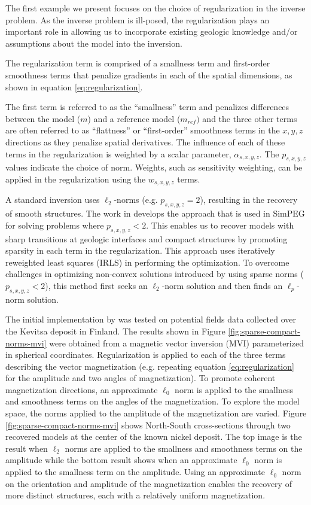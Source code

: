 The first example we present focuses on the choice of regularization in the inverse problem. As the inverse problem is ill-posed, the regularization plays an important role in allowing us to incorporate existing geologic knowledge and/or assumptions about the model into the inversion.

The regularization term is comprised of a smallness term and first-order smoothness terms that penalize gradients in each of the spatial dimensions, as shown in equation \ref{eq:regularization}.

The first term is referred to as the ``smallness'' term and penalizes differences between the model ($m$) and a reference model ($m_{ref})$ and the three other terms are often referred to as ``flattness'' or ``first-order'' smoothness terms in the $x, y, z$ directions as they penalize spatial derivatives. The influence of each of these terms in the regularization is weighted by a scalar parameter, $\alpha_{s, x, y, z}$. The $p_{s, x, y, z}$ values indicate the choice of norm. Weights, such as sensitivity weighting, can be applied in the regularization using the $w_{s,x,y,z}$ terms.

A standard inversion uses $\ell_2$-norms (e.g. $p_{s, x, y, z} =2$), resulting in the recovery of smooth structures. The work in \cite{fournier_inversion_2019} develops the approach that is used in SimPEG for solving problems where $p_{s, x, y, z} < 2$. This enables us to recover models with sharp transitions at geologic interfaces and compact structures by promoting sparsity in each term in the regularization. This approach uses iteratively reweighted least squares (IRLS) in performing the optimization. To overcome challenges in optimizing non-convex solutions introduced by using sparse norms ($p_{s, x, y, z} < 2$), this method first seeks an $\ell_2$-norm solution and then finds an $\ell_p$-norm solution.

The initial implementation by \citep{fournier_sparse_2020} was tested on potential fields data collected over the Kevitsa deposit in Finland. The results shown in Figure \ref{fig:sparse-compact-norms-mvi} were obtained from a magnetic vector inversion (MVI) parameterized in spherical coordinates. Regularization is applied to each of the three terms describing the vector magnetization (e.g. repeating equation \ref{eq:regularization} for the amplitude and two angles of magnetization). To promote coherent magnetization directions, an approximate $\ell_0$ norm is applied to the smallness and smoothness terms on the angles of the magnetization. To explore the model space, the norms applied to the amplitude of the magnetization are varied. Figure \ref{fig:sparse-compact-norms-mvi} shows North-South cross-sections through two recovered models at the center of the known nickel deposit. The top image is the result when $\ell_2$ norms are applied to the smallness and smoothness terms on the amplitude while the bottom result shows when an approximate $\ell_0$ norm is applied to the smallness term on the amplitude. Using an approximate $\ell_0$ norm on the orientation and amplitude of the magnetization enables the recovery of more distinct structures, each with a relatively uniform magnetization.

